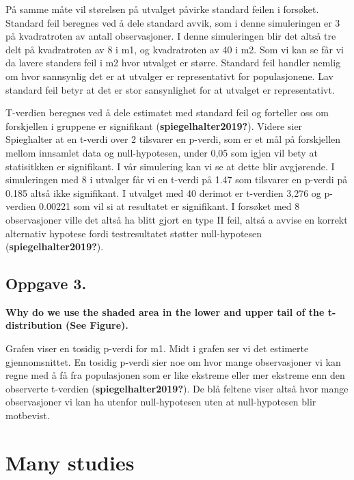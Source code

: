 \documentclass[
  letterpaper,
  DIV=11,
  numbers=noendperiod]{scrreprt}
\begin{document}
På samme måte vil størelsen på utvalget påvirke standard feilen i
forsøket. Standard feil beregnes ved å dele standard avvik, som i denne
simuleringen er 3 på kvadratroten av antall observasjoner. I denne
simuleringen blir det altså tre delt på kvadratroten av 8 i m1, og
kvadratroten av 40 i m2. Som vi kan se får vi da lavere standers feil i
m2 hvor utvalget er større. Standard feil handler nemlig om hvor
sannsynlig det er at utvalger er representativt for populasjonene. Lav
standard feil betyr at det er stor sansynlighet for at utvalget er
representativt.

T-verdien beregnes ved å dele estimatet med standard feil og forteller
oss om forskjellen i gruppene er signifikant
(\textbf{spiegelhalter2019?}). Videre sier Spieghalter at en t-verdi
over 2 tilsvarer en p-verdi, som er et mål på forskjellen mellom
innsamlet data og null-hypotesen, under 0,05 som igjen vil bety at
statisitkken er signifikant. I vår simulering kan vi se at dette blir
avgjørende. I simuleringen med 8 i utvalger får vi en t-verdi på 1.47
som tilsvarer en p-verdi på 0.185 altså ikke signifikant. I utvalget med
40 derimot er t-verdien 3,276 og p-verdien 0.00221 som vil si at
resultatet er signifikant. I forsøket med 8 observasjoner ville det
altså ha blitt gjort en type II feil, altså a avvise en korrekt
alternativ hypotese fordi testresultatet støtter null-hypotesen
(\textbf{spiegelhalter2019?}).

\section{Oppgave 3.}\label{oppgave-3.}

\textbf{Why do we use the shaded area in the lower and upper tail of the
t-distribution (See Figure).}

Grafen viser en tosidig p-verdi for m1. Midt i grafen ser vi det
estimerte gjennomsnittet. En tosidig p-verdi sier noe om hvor mange
observasjoner vi kan regne med å få fra populasjonen som er like
ekstreme eller mer ekstreme enn den observerte t-verdien
(\textbf{spiegelhalter2019?}). De blå feltene viser altså hvor mange
observasjoner vi kan ha utenfor null-hypotesen uten at null-hypotesen
blir motbevist.


\chapter{Many studies}\label{many-studies}
\end{document}
